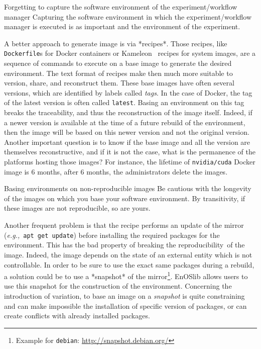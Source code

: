 \documentclass[sigconf,natbib=false]{acmart}
\newcommand{\repro}{reproducibility}
\newcommand{\eg}{\emph{e.g.,}}
\begin{document}
\begin{trap}{Forgetting to capture the software environment of the experiment/workflow manager}{}
Capturing the software environment in which the experiment/workflow manager is executed is as important and the environment of the experiment.
\end{trap}

A better approach to generate image is via *recipes*.
Those recipes, like \texttt{Dockerfile}s for Docker containers or Kameleon\ \cite{ruiz_reconstructable_2015} recipes for system images, are a sequence of commands to execute on a base image to generate the desired environment.
The text format of recipes make then much more suitable to version, share, and reconstruct them.
These base images have often several versions, which are identified by labels called \emph{tags}.
In the case of Docker, the tag of the latest version is often called \texttt{latest}.
Basing an environment on this tag breaks the traceability, and thus the reconstruction of the image itself.
Indeed, if a newer version is available at the time of a future rebuild of the environment, then the image will be based on this newer version and not the original version.
Another important question is to know if the base image and all the version are themselves reconstructive, and if it is not the case, what is the permanence of the platforms hosting those images?
For instance, the lifetime of \texttt{nvidia/cuda} Docker image is 6 months, after 6 months, the administrators delete the images.

\begin{trap}{Basing environments on non-reproducible images}{}
Be cautious with the longevity of the images on which you base your software environment.
By transitivity, if these images are not reproducible, so are yours.
\end{trap}

Another frequent problem is that the recipe performs an update of the mirror (\eg\ \texttt{apt get update}) before installing the required packages for the environment.
This has the bad property of breaking the \repro\ of the image.
Indeed, the image depends on the state of an external entity which is not controllable.
In order to be sure to use the exact same packages during a rebuild, a solution could be to use a *snapshot* of the mirror\footnote{Example for \texttt{debian}: \url{http://snapshot.debian.org/}}.
EnOSlib allows users to use this snapshot for the construction of the environment.
Concerning the introduction of variation, to base an image on a \emph{snapshot} is quite constraining and can make impossible the installation of specific version of packages, or can create conflicts with already installed packages.
\end{document}
